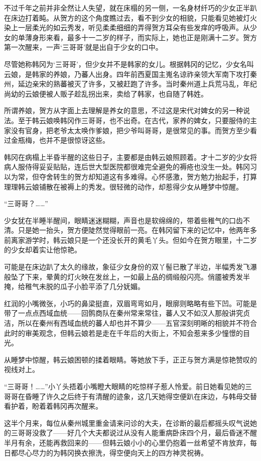 不过千年之前并非全然让人失望，就在床榻的另一侧，一名身材纤巧的少女正半趴在床边打着盹。从贺方的这个角度瞧过去，看不到少女的相貌，只能看见她被灯火染上一层柔光的如云秀发，听见柔柔细细的弄得贺方耳朵有些发痒的呼吸声。从少女的单薄身形来看，最多十一二岁的样子，而实际上，她也正是刚满十二岁。贺方第一次醒来，一声‘三哥哥’就是出自于少女的口中。

尽管她称韩冈为‘三哥哥’，但少女并不是韩家的女儿。根据韩冈的记忆，少女名叫云娘，是韩家的养娘，乃蕃人出身。四年前西夏国主嵬名谅祚亲领大军南下攻打秦州，延边亲宋的熟蕃被灭了许多，又被赶跑了许多。当时秦州道上兵荒马乱，年纪尚幼的云娘便被人贩子趁乱拐出来，卖给了韩家，也自随了韩姓。

所谓养娘，贺方从字面上去理解是养女的意思，不过这是宋代对婢女的另一种说法。至于韩云娘唤韩冈作三哥哥，也不出奇。在古代，家养的婢女，只要服侍的主家没有官身，把老爷太太唤作爹娘，把少爷叫哥哥，是很常见的事。而贺方至少看过金瓶梅，也并不是很惊讶这些。

韩冈在病榻上半昏半醒的这些日子，主要都是由韩云娘照顾着。才十二岁的少女将病人服侍得妥妥贴贴，连后世大型医院都很难完全避免的褥疮也没生一处。韩冈习以为常，但夺舍转生的贺方却知道这有多难得。心怀感激，贺方勉力抬起手，打算理理韩云娘铺散在被褥上的秀发。很轻微的动作，却惹得少女从睡梦中惊醒。

“三哥哥？……”

少女犹在半睡半醒间，眼睛迷迷糊糊，声音也是软绵绵的，带着些稚气的口齿不清。只是她一抬头，贺方便陡然觉得眼前一亮。在韩冈留下来的记忆中，他两年多前离家游学时，韩云娘只是一个还没长开的黄毛丫头。但如今在贺方眼里，十二岁的少女却着实让他惊艳。

可能是在床边趴了太久的缘故，象征少女身份的双丫髻已散了半边，半幅秀发飞瀑般坠了下来，晕黄的灯火映在发丝上，一如最上品的绸缎般闪亮。俏靥被秀发半掩，给稚气未脱的瓜子小脸平添了几分妩媚。

红润的小嘴微张，小巧的鼻梁挺直，双眉弯弯如月，眼廓则略略有些下凹。可能是带了一点点西域血统——回鹘商队在秦州常来常往，蕃人又不如汉人那般讲究贞洁，所以在秦州有西域血统的蕃人却也并不算少——五官深刻明晰的相貌并不符合此时的审美观念，但韩云娘若是走在千年后的大街上，不知会惹来多少憧憬的目光。

从睡梦中惊醒，韩云娘困顿的揉着眼睛。等她放下手，正正与贺方满是惊艳赞叹的视线对上。

“三哥哥！……”小丫头捂着小嘴瞪大眼睛的吃惊样子惹人怜爱。前日她看见她的三哥哥在昏睡了许久之后终于有清醒的迹象，这几天她得空便趴在床边，与韩母交替看护着，盼着着韩冈再次醒来。

这半个月来，每位从秦州城里重金请来问诊的大夫，在诊断的最后都摇头叹气说她的三哥哥没救了——好几个大夫都说过从没有人能重病卧床四个月，最后昏迷不醒半月有余，还能再救回来的——但韩云娘小小的心里仍抱着一丝希望不肯放弃，每日都尽心尽力的为韩冈换衣擦洗，得空便向天上的四方神灵祝祷。

